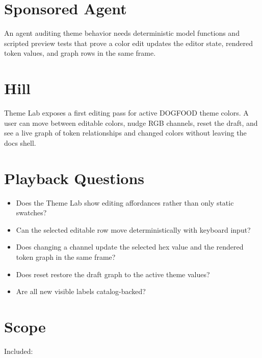 \section{Sponsored Agent}\label{record-187-sponsored-agent}

An agent auditing theme behavior needs deterministic model functions and scripted preview tests that prove a color edit updates the editor state, rendered token values, and graph rows in the same frame.

\section{Hill}\label{record-187-hill}

Theme Lab exposes a first editing pass for active DOGFOOD theme colors. A user can move between editable colors, nudge RGB channels, reset the draft, and see a live graph of token relationships and changed colors without leaving the docs shell.

\section{Playback Questions}\label{record-187-playback-questions}

\begin{itemize}
\tightlist
\item
  Does the Theme Lab show editing affordances rather than only static swatches?
\item
  Can the selected editable row move deterministically with keyboard input?
\item
  Does changing a channel update the selected hex value and the rendered token graph in the same frame?
\item
  Does reset restore the draft graph to the active theme values?
\item
  Are all new visible labels catalog-backed?
\end{itemize}

\section{Scope}\label{record-187-scope}

Included:

